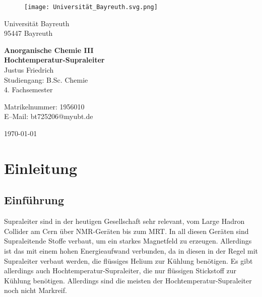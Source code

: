 \documentclass[12pt, a4paper]{article}
\begin{document}
\begin{figure}
    \texttt{[image: Universität\_Bayreuth.svg.png]}
\end{figure}



{\raggedright Universität Bayreuth\\  95447 Bayreuth}


\vspace{5cm}

\begin{center}
{\LARGE\bf{Anorganische Chemie III}} \\  
\vspace{1cm}
{\Large\bf{Hochtemperatur-Supraleiter}}\\
\vspace{0.5cm}
{\large Justus Friedrich\\}
{Studiengang: B.Sc. Chemie\\}
{4. Fachsemester}
\end{center}





\thispagestyle{empty}
\begin{center}
{\small Matrikelnummer: 1956010 \\
E–Mail:  bt725206@myubt.de}
\end{center}

\vspace{5cm}

\begin{center}
  \today
\end{center}


\newpage
\tableofcontents
\thispagestyle{empty}


\newpage
\setcounter{page}{1}
\section{Einleitung}



\subsection{Einführung}
{Supraleiter sind in der heutigen Gesellschaft sehr relevant, vom Large Hadron Collider am Cern über NMR-Geräten bis zum MRT. 
In all diesen Geräten sind Supraleitende Stoffe verbaut, um ein starkes Magnetfeld zu erzeugen. Allerdings ist das mit einem hohen 
Energieaufwand verbunden, da in diesen in der Regel mit Supraleiter verbaut werden, die flüssiges Helium zur Kühlung 
benötigen. Es gibt allerdings auch Hochtemperatur-Supraleiter, die nur flüssigen Stickstoff zur Kühlung benötigen. Allerdings sind die 
meisten der Hochtemperatur-Supraleiter noch nicht Markreif.\cite{Buckel.2013}
}
\end{document}
